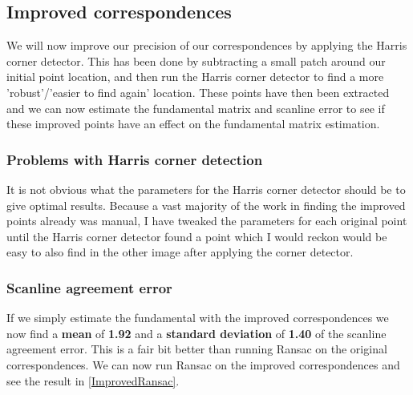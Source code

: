 \subsection{Improved correspondences}
We will now improve our precision of our correspondences by applying the Harris corner detector. This has been done by subtracting a small patch around our initial point location, and then run the Harris corner detector to find a more 'robust'/'easier to find again' location. These points have then been extracted and we can now estimate the fundamental matrix and scanline error to see if these improved points have an effect on the fundamental matrix estimation.

\subsubsection{Problems with Harris corner detection}
It is not obvious what the parameters for the Harris corner detector should be to give optimal results. Because a vast majority of the work in finding the improved points already was manual, I have tweaked the parameters for each original point until the Harris corner detector found a point which I would reckon would be easy to also find in the other image after applying the corner detector.

\subsubsection{Scanline agreement error}
If we simply estimate the fundamental with the improved correspondences we now find a \textbf{mean} of \textbf{1.92} and a \textbf{standard deviation} of \textbf{1.40} of the scanline agreement error. This is a fair bit better than running Ransac on the original correspondences. We can now run Ransac on the improved correspondences and see the result in \autoref{ImprovedRansac}.


